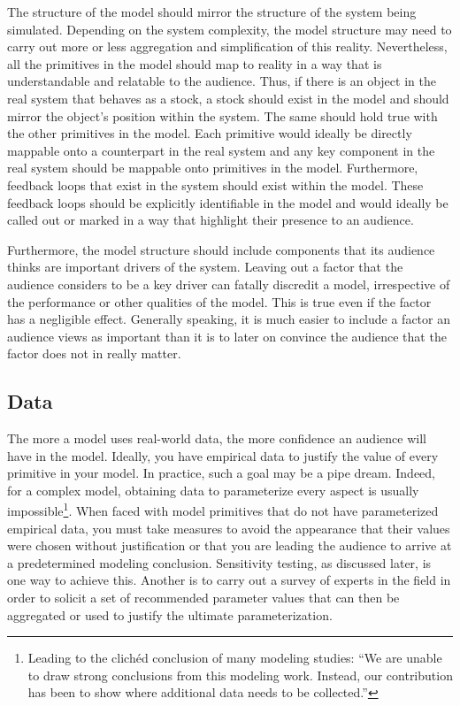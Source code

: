 \documentclass[]{memoir}
\begin{document}
The structure of the model should mirror the structure of the system
being simulated. Depending on the system complexity, the model structure
may need to carry out more or less aggregation and simplification of
this reality. Nevertheless, all the primitives in the model should map
to reality in a way that is understandable and relatable to the
audience. Thus, if there is an object in the real system that behaves as
a stock, a stock should exist in the model and should mirror the
object's position within the system. The same should hold true with the
other primitives in the model. Each primitive would ideally be directly
mappable onto a counterpart in the real system and any key component in
the real system should be mappable onto primitives in the model.
Furthermore, feedback loops that exist in the system should exist within
the model. These feedback loops should be explicitly identifiable in the
model and would ideally be called out or marked in a way that highlight
their presence to an audience.

Furthermore, the model structure should include components that its
audience thinks are important drivers of the system. Leaving out a
factor that the audience considers to be a key driver can fatally
discredit a model, irrespective of the performance or other qualities of
the model. This is true even if the factor has a negligible effect.
Generally speaking, it is much easier to include a factor an audience
views as important than it is to later on convince the audience that the
factor does not in really matter.

\subsection{Data}

The more a model uses real-world data, the more confidence an audience
will have in the model. Ideally, you have empirical data to justify the
value of every primitive in your model. In practice, such a goal may be
a pipe dream. Indeed, for a complex model, obtaining data to
parameterize every aspect is usually impossible\footnote{Leading to the
  clichéd conclusion of many modeling studies: ``We are unable to draw
  strong conclusions from this modeling work. Instead, our contribution
  has been to show where additional data needs to be collected.''}. When
faced with model primitives that do not have parameterized empirical
data, you must take measures to avoid the appearance that their values
were chosen without justification or that you are leading the audience
to arrive at a predetermined modeling conclusion. Sensitivity testing,
as discussed later, is one way to achieve this. Another is to carry out
a survey of experts in the field in order to solicit a set of
recommended parameter values that can then be aggregated or used to
justify the ultimate parameterization.
\end{document}
